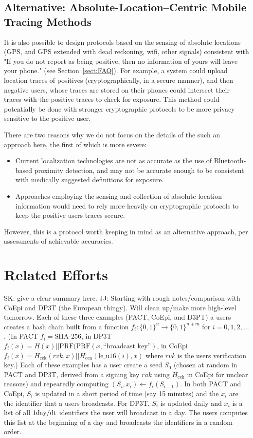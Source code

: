 \documentclass{article}
\newcommand{\sk}[1]{\textsf{\color{magenta} SK: #1}}
\begin{document}
\subsection{Alternative: Absolute-Location--Centric Mobile Tracing Methods}\label{sect:GPS}
It is also possible to design protocols based on the sensing of absolute locations (GPS, and GPS extended with dead reckoning, wifi, other signals) consistent with "If you do not report as being positive, then no information of yours will leave your phone." (see Section~\ref{sect:FAQ}).  For example, a system could upload location traces of positives (cryptographically, in a secure manner), and then negative users, whose traces are stored on their phones could intersect their traces with the positive traces to check for exposure. This method could potentially be done with stronger cryptographic protocols to be more privacy sensitive to the positive user.

There are two reasons why we do not focus on the details of the such an approach here, the first of which is more severe:
\begin{itemize}
    \item Current localization technologies are not as accurate as the use of Bluetooth-based proximity detection, and may not be accurate enough to be consistent with medically suggested definitions for exposure.
    \item Approaches employing the sensing and collection of absolute location information would need to rely more heavily on cryptographic protocols to keep the positive users traces secure.
\end{itemize}
However, this is a protocol worth keeping in mind as an alternative approach, per assessments of achievable accuracies.

\section{Related Efforts}

\sk{give a clear summary here.}
{\textsf{\color{blue} JJ: Starting with rough notes/comparison with CoEpi and DP3T (the European thingy). Will clean up/make more high-level tomorrow.}}
Each of these three examples (PACT, CoEpi, and D3PT) a users creates a hash chain built from a function $f_i: \{0,1\}^n \to \{0,1\}^{n+m}$ for $i=0,1,2,\dots$.
(In PACT $f_i=\textrm{SHA-256}$, 
in DP3T $f_i(x)=H(x)||\mathrm{PRF}(\mathrm{PRF}(x,\mbox{``broadcast key''})$, 
in CoEpi $f_i(x)=H_{\mathrm{cek}}(rvk,x)||H_{\mathrm{cen}}(\mbox{le\_u16}(i),x)$ where $rvk$ is the users verification key.)
Each of these examples has a user create a seed $S_0$ (chosen at random in PACT and DP3T, derived from a signing key ${rak}$ using $H_{\mathrm{cek}}$ in CoEpi for unclear reasons) and repeatedly computing $(S_i,x_i)\gets f_i(S_{i-1})$. In both PACT and CoEpi, $S_i$ is updated in a short period of time (say 15 minutes) and the $x_i$ are the identifier that a users broadcasts. For DP3T, $S_i$ is updated daily and $x_i$ is a list of all $1\mbox{day}/\mathrm{dt}$ identifiers the user will broadcast in a day. The users computes this list at the beginning of a day and broadcasts the identifiers in a random order. 
\end{document}
